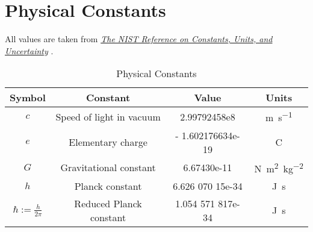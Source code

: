 \section{Physical Constants}
All values are taken from \href{https://physics.nist.gov/cuu/Constants/index.html}{\emph{The NIST Reference on Constants, Units, and Uncertainty}} \cite{NIST-const}.
\begin{table}[htbp]
  \centering
  \caption{Physical Constants}
  \label{tab:physical_constants}
  \begin{tabular}{ccS[table-format=+1.9e+2]c}
    \toprule
    \textbf{Symbol}           & \textbf{Constant}        & {\textbf{Value}}  & \textbf{Units}                                  \\
    \midrule
    $c$                       & Speed of light in vacuum & 2.99792458e8      & \si{\meter\per\second}                          \\
    $e$                       & Elementary charge        & - 1.602176634e-19 & \si{\coulomb}                                   \\
    $G$                       & Gravitational constant   & 6.67430e-11       & \si{\newton\meter\squared\per\kilogram\squared} \\
    $h$                       & Planck constant          & 6.626 070 15e-34  & \si{\joule\second}                              \\
    $\hbar := \frac{h}{2\pi}$ & Reduced Planck constant  & 1.054 571 817e-34 & \si{\joule\second}                              \\
    \bottomrule
  \end{tabular}
\end{table}